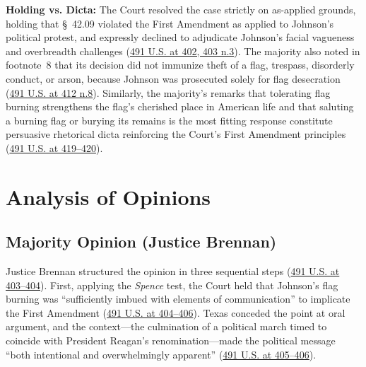 \documentclass[12pt]{article}
\begin{document}
\textbf{Holding vs. Dicta:} The Court resolved the case strictly on as-applied grounds, holding that \S~42.09 violated the First Amendment as applied to Johnson's political protest, and expressly declined to adjudicate Johnson's facial vagueness and overbreadth challenges (\href{https://supreme.justia.com/cases/federal/us/491/397/}{491 U.S. at 402, 403 n.3}). The majority also noted in footnote~8 that its decision did not immunize theft of a flag, trespass, disorderly conduct, or arson, because Johnson was prosecuted solely for flag desecration (\href{https://supreme.justia.com/cases/federal/us/491/397/}{491 U.S. at 412 n.8}). Similarly, the majority's remarks that tolerating flag burning strengthens the flag's cherished place in American life and that saluting a burning flag or burying its remains is the most fitting response constitute persuasive rhetorical dicta reinforcing the Court's First Amendment principles (\href{https://supreme.justia.com/cases/federal/us/491/397/}{491 U.S. at 419--420}).

\section{Analysis of Opinions}

\subsection{Majority Opinion (Justice Brennan)}
Justice Brennan structured the opinion in three sequential steps (\href{https://supreme.justia.com/cases/federal/us/491/397/}{491 U.S. at 403--404}). First, applying the \textit{Spence} test, the Court held that Johnson's flag burning was ``sufficiently imbued with elements of communication'' to implicate the First Amendment (\href{https://supreme.justia.com/cases/federal/us/491/397/}{491 U.S. at 404--406}). Texas conceded the point at oral argument, and the context---the culmination of a political march timed to coincide with President Reagan's renomination---made the political message ``both intentional and overwhelmingly apparent'' (\href{https://supreme.justia.com/cases/federal/us/491/397/}{491 U.S. at 405--406}).
\end{document}
